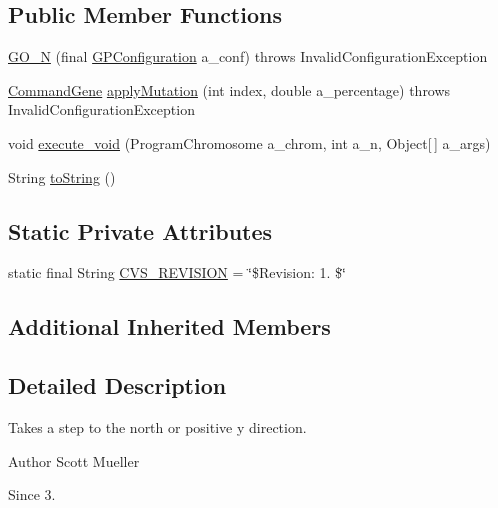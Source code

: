 \subsection*{Public Member Functions}
\begin{DoxyCompactItemize}
\item 
\hyperlink{classexamples_1_1gp_1_1painted_desert_1_1_g_o___n_a7e4389274384f1605d15bed6f5a4ed35}{G\-O\-\_\-\-N} (final \hyperlink{classorg_1_1jgap_1_1gp_1_1impl_1_1_g_p_configuration}{G\-P\-Configuration} a\-\_\-conf)  throws Invalid\-Configuration\-Exception 
\item 
\hyperlink{classorg_1_1jgap_1_1gp_1_1_command_gene}{Command\-Gene} \hyperlink{classexamples_1_1gp_1_1painted_desert_1_1_g_o___n_a118999b008cee240df2cf4b99dbc663d}{apply\-Mutation} (int index, double a\-\_\-percentage)  throws Invalid\-Configuration\-Exception 
\item 
void \hyperlink{classexamples_1_1gp_1_1painted_desert_1_1_g_o___n_ae3d9d3baf88061fa64a06241600fbb7d}{execute\-\_\-void} (Program\-Chromosome a\-\_\-chrom, int a\-\_\-n, Object\mbox{[}$\,$\mbox{]} a\-\_\-args)
\item 
String \hyperlink{classexamples_1_1gp_1_1painted_desert_1_1_g_o___n_a7d88cd87187070fa852225a93bec8962}{to\-String} ()
\end{DoxyCompactItemize}
\subsection*{Static Private Attributes}
\begin{DoxyCompactItemize}
\item 
static final String \hyperlink{classexamples_1_1gp_1_1painted_desert_1_1_g_o___n_a77e416abda401f216bf6d87867347658}{C\-V\-S\-\_\-\-R\-E\-V\-I\-S\-I\-O\-N} = \char`\"{}\$Revision\-: 1. \$\char`\"{}
\end{DoxyCompactItemize}
\subsection*{Additional Inherited Members}


\subsection{Detailed Description}
Takes a step to the north or positive y direction.

\begin{DoxyAuthor}{Author}
Scott Mueller 
\end{DoxyAuthor}
\begin{DoxySince}{Since}
3. 
\end{DoxySince}



